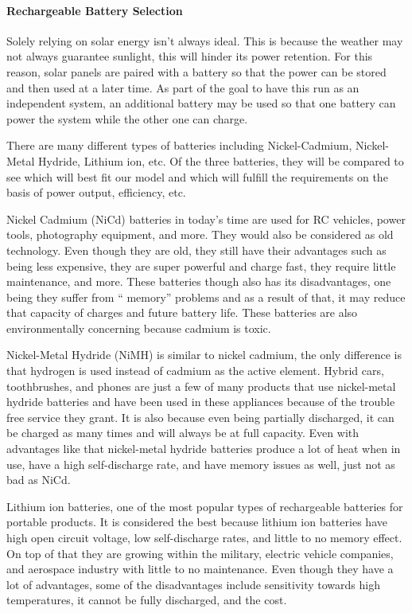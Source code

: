 \paragraph{Rechargeable Battery Selection}
Solely relying on solar energy isn’t always ideal. This is because the weather may not always guarantee sunlight, this will hinder its power retention. For this reason, solar panels are paired with a battery so that the power can be stored and then used at a later time. As part of the goal to have this run as an independent system, an additional battery may be used so that one battery can power the system while the other one can charge.

There are many different types of batteries including Nickel-Cadmium, Nickel-Metal Hydride, Lithium ion, etc. Of the three batteries, they will be compared to see which will best fit our model and which will fulfill the requirements on the basis of power output, efficiency, etc.

Nickel Cadmium (NiCd) batteries in today’s time are used for RC vehicles, power tools, photography equipment, and more. They would also be considered as old technology. Even though they are old, they still have their advantages such as being less expensive, they are super powerful and charge fast, they require little maintenance, and more. These batteries though also has its disadvantages, one being they suffer from “ memory” problems and as a result of that, it may reduce that capacity of charges and future battery life. These batteries are also environmentally concerning because cadmium is toxic.

Nickel-Metal Hydride (NiMH) is similar to nickel cadmium, the only difference is that hydrogen is used instead of cadmium as the active element. Hybrid cars, toothbrushes, and phones are just a few of many products that use nickel-metal hydride batteries and have been used in these appliances because of the trouble free service they grant. It is also because even being partially discharged, it can be charged as many times and will always be at full capacity. Even with advantages like that nickel-metal hydride batteries produce a lot of heat when in use, have a high self-discharge rate, and have memory issues as well, just not as bad as NiCd.

Lithium ion batteries, one of the most popular types of rechargeable batteries for portable products. It is considered the best because lithium ion batteries have high open circuit voltage, low self-discharge rates, and little to no memory effect. On top of that they are growing within the military, electric vehicle companies, and aerospace industry with little to no maintenance. Even though they have a lot of advantages, some of the disadvantages include sensitivity towards high temperatures, it cannot be fully discharged, and the cost.

